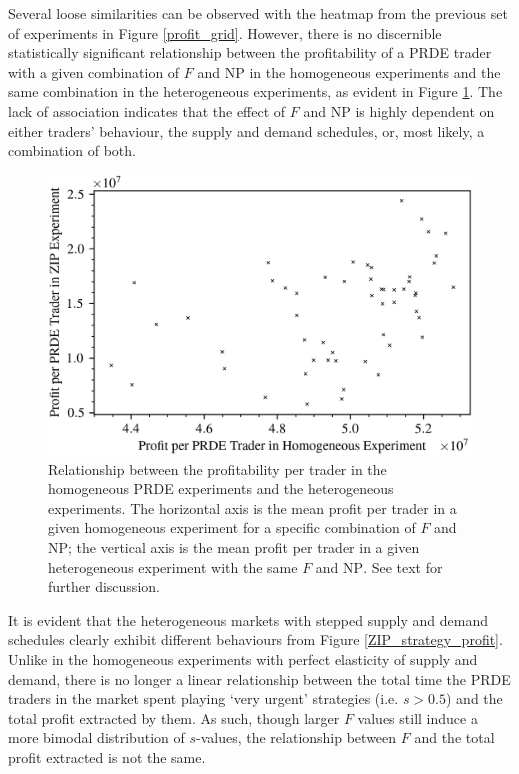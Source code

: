 \documentclass[a4paper,twoside]{article}
\begin{document}
Several loose similarities can be observed with the heatmap from the previous set of experiments in Figure \ref{profit_grid}.
However, there is no discernible statistically significant relationship between the profitability of a PRDE trader with a given combination of $F$ and $\mathrm{NP}$ in the homogeneous experiments and the same combination in the heterogeneous experiments, as evident in Figure \ref{homo_zip_scatter}.
The lack of association indicates that the effect of $F$ and $\mathrm{NP}$ is highly dependent on either traders' behaviour, the supply and demand schedules, or, most likely, a combination of both.

\begin{figure}[htbp]
    \centerline{\includegraphics[width=\columnwidth]{homo_zip_scatter.png}}
    \caption{
        Relationship between the profitability per trader in the homogeneous PRDE experiments and the heterogeneous experiments.
        The horizontal axis is the mean profit per trader in a given homogeneous experiment for a specific combination of $F$ and $\mathrm{NP}$; the vertical axis is the mean profit per trader in a given heterogeneous experiment with the same $F$ and $\mathrm{NP}$.
        See text for further discussion.
    }
    \label{homo_zip_scatter}
\end{figure}

It is evident that the heterogeneous markets with stepped supply and demand schedules clearly exhibit different behaviours from Figure \ref{ZIP_strategy_profit}.
Unlike in the homogeneous experiments with perfect elasticity of supply and demand, there is no longer a linear relationship between the total time the PRDE traders in the market spent playing `very urgent' strategies (i.e. $s>0.5$) and the total profit extracted by them.
As such, though larger $F$ values still induce a more bimodal distribution of $s$-values, the relationship between $F$ and the total profit extracted is not the same.
\end{document}
